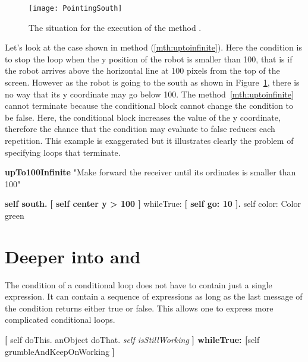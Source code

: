 \begin{figure}[h]
\begin{center}\texttt{[image: PointingSouth]}\end{center}
\caption{The situation for the execution of the method . \label{fig:PointingSouth}}
\end{figure}

Let's look at the case shown in method  (\ref{mth:uptoinfinite}). Here the condition is to stop the loop when the y position of the robot is smaller than 100, that is if the robot arrives above the horizontal line at 100 pixels from the top of the screen.
However as the robot is going to the south as shown in Figure~\ref{fig:PointingSouth}, there is no way that its y coordinate may go below 100. The method~\ref{mth:uptoinfinite} cannot terminate because  the conditional block cannot change the condition to be false. Here, the conditional block increases the value of the y coordinate, therefore the chance that the condition may evaluate to false reduces each repetition. This example is exaggerated but it illustrates clearly the problem of specifying loops that terminate. 

\begin{method}\label{mth:uptoinfinite}
\textbf{upTo100Infinite}
   "Make forward the receiver until its ordinates is smaller than 100"

   \textbf{self south.}
   \textbf{[ self center y > 100 ]}
      whileTrue: \textbf{[ self go: 10 ].}
   self color: Color green
\end{method}


\section{Deeper into  and }
The condition of a conditional loop does not have to contain just a single expression. It can contain a sequence of expressions as long as the last message of the condition returns either true or false. This allows one to express more complicated conditional loops. 


\begin{template}
\textbf{[} self doThis.
anObject doThat.
\emph{self isStillWorking} \textbf{] whileTrue: 
   [}self grumbleAndKeepOnWorking \textbf{]}
\end{template}

